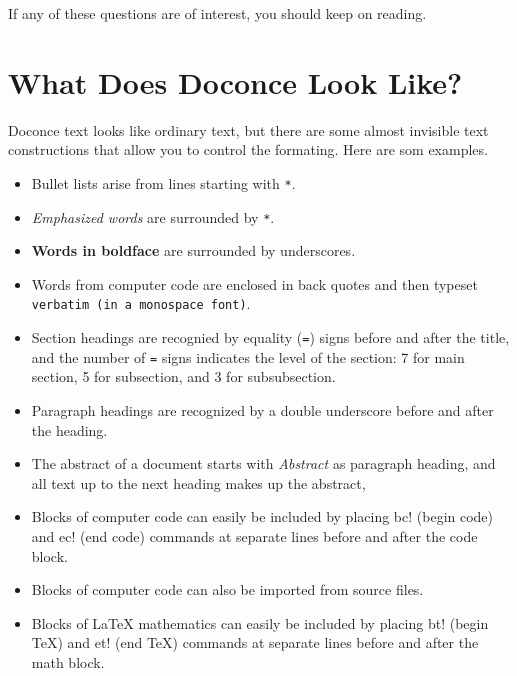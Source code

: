 \documentclass[%
oneside,                 %
final,                   %
10pt]{article}
\begin{document}
\noindent
If any of these questions are of interest, you should keep on reading.


\section{What Does Doconce Look Like?}

Doconce text looks like ordinary text, but there are some almost invisible
text constructions that allow you to control the formating. Here are
som examples.

\begin{itemize}
  \item Bullet lists arise from lines starting with {\fontsize{10pt}{10pt}\Verb!*!}.

  \item \emph{Emphasized words} are surrounded by {\fontsize{10pt}{10pt}\Verb!*!}.

  \item \textbf{Words in boldface} are surrounded by underscores.

  \item Words from computer code are enclosed in back quotes and
    then typeset {\fontsize{10pt}{10pt}\Verb!verbatim (in a monospace font)!}.

  \item Section headings are recognied by equality ({\fontsize{10pt}{10pt}\Verb!=!}) signs before
    and after the title, and the number of {\fontsize{10pt}{10pt}\Verb!=!} signs indicates the
    level of the section: 7 for main section, 5 for subsection, and
    3 for subsubsection.

  \item Paragraph headings are recognized by a double underscore
    before and after the heading.

  \item The abstract of a document starts with \emph{Abstract} as paragraph
    heading, and all text up to the next heading makes up the abstract,

  \item Blocks of computer code can easily be included by placing
    {\fontsize{10pt}{10pt}\Verb!!bc!} (begin code) and {\fontsize{10pt}{10pt}\Verb!!ec!} (end code) commands at separate lines
    before and after the code block.

  \item Blocks of computer code can also be imported from source files.

  \item Blocks of {\LaTeX} mathematics can easily be included by placing
    {\fontsize{10pt}{10pt}\Verb!!bt!} (begin TeX) and {\fontsize{10pt}{10pt}\Verb!!et!} (end TeX) commands at separate lines
    before and after the math block.


\end{itemize}
\end{document}

